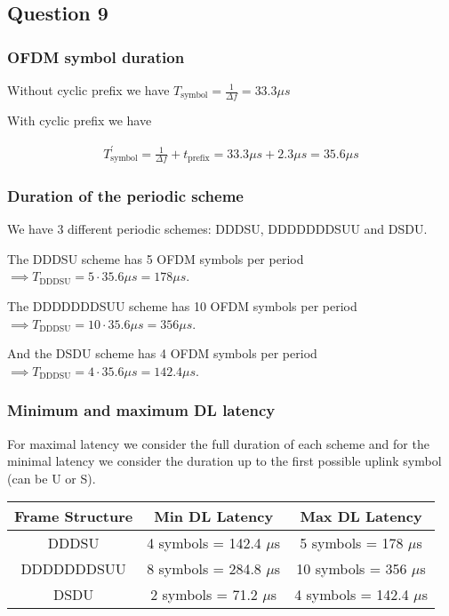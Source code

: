 \documentclass[]{article}
\begin{document}
	\subsection*{Question 9}
	
	\subsubsection*{OFDM symbol duration}
	
	Without cyclic prefix we have $T_{\text{symbol}} = \frac{1}{\Delta f} = 33.3 \mu s$
	
	With cyclic prefix we have
	
	\begin{align}
		T_{\text{symbol}}^\prime = \frac{1}{\Delta f} + t_{\text{prefix}} = 33.3\mu s + 2.3\mu s = 35.6 \mu s
	\end{align}
	
	\subsubsection*{Duration of the periodic scheme}
	
	We have 3 different periodic schemes: DDDSU, DDDDDDDSUU and DSDU.
	
	The DDDSU scheme has 5 OFDM symbols per period $\implies T_{\text{DDDSU}} = 5 \cdot 35.6 \mu s = 178 \mu s$.
	
	The DDDDDDDSUU scheme has 10 OFDM symbols per period $\implies T_{\text{DDDSU}} = 10 \cdot 35.6 \mu s = 356 \mu s$.
	
	And the DSDU scheme has 4 OFDM symbols per period $\implies T_{\text{DDDSU}} = 4 \cdot 35.6 \mu s = 142.4 \mu s$.
	
	\subsubsection*{Minimum and maximum DL latency}
	
	For maximal latency we consider the full duration of each scheme and for the minimal latency we consider the duration up to the first possible uplink symbol (can be U or S).
	
	\begin{table}[h]
		\centering
		\begin{tabular}{|c|c|c|}
			\hline
			\textbf{Frame Structure} & \textbf{Min DL Latency} & \textbf{Max DL Latency} \\
			\hline
			DDDSU & 4 symbols = 142.4 $\mu$s & 5 symbols = 178 $\mu$s \\
			\hline
			DDDDDDDSUU & 8 symbols = 284.8 $\mu$s & 10 symbols = 356 $\mu$s \\
			\hline
			DSDU & 2 symbols = 71.2 $\mu$s & 4 symbols = 142.4 $\mu$s \\
			\hline
		\end{tabular}
	\end{table}
	
\end{document}
